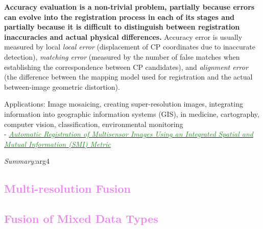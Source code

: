 \documentclass[]{article}
\newcommand{\paperentry}[4]{
            \hangindent=1cm
            \textcolor{red}{\cite{#1}} - \href{run:../References/#3}{\textcolor{ForestGreen}{\textit{#2}}}
            
            \noindent            
            \begin{minipage}[t]{0.1\linewidth}\hfill\end{minipage}
            \begin{minipage}[t]{0.8\linewidth}\textcolor{NavyBlue}{{\textit{Summary:}}}#4\end{minipage}
            \vspace{.25cm}
          }
\begin{document}
		\noindent
		\textbf{Accuracy evaluation is a non-trivial problem, partially because errors can evolve into the registration process in each of its stages and partially because it is difficult to distinguish between registration inaccuracies and actual physical differences.}  Accuracy error is usually measured by local \textit{local error} (displacement of CP coordinates due to inaccurate detection), \textit{matching error} (measured by the number of false matches when establishing the correspondence between CP candidates), and \textit{alignment error} (the difference between the mapping model used for registration and the actual between-image geometric distortion).
		
		\noindent
		Applications: Image mosaicing, creating super-resolution images, integrating information into geographic information systems (GIS), in medicine, cartography, computer vision, classification, environmental monitoring \\
		
		\paperentry{Liang2014ImageRegistrationMutualInformation}
		{Automatic Registration of Multisensor Images Using an Integrated Spatial and Mutual Information (SMI) Metric}
		{Fusion/Liang2014ImageRegistrationMutualInformation.pdf}
		{arg4}
		
	
%	
%	
%	
		
	\textcolor{Violet}{\subsection{Multi-resolution Fusion}}
	
	\textcolor{Violet}{\subsection{Fusion of Mixed Data Types}}
		
\end{document}

